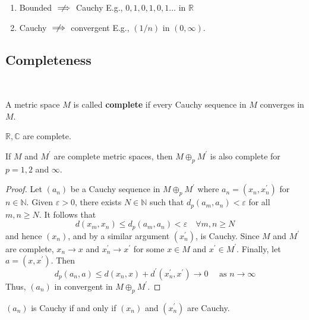 \documentclass[a4paper]{article}
\begin{document}
\begin{remark}
\begin{enumerate}
    \item Bounded $\centernot\implies$ Cauchy E.g., $0,1,0,1,0,1 \ldots$ in $\mathbb{R}$
    \item Cauchy $\centernot\implies$ convergent E.g., $(1 / n)$ in $(0, \infty)$.
\end{enumerate}
\end{remark}

\subsection{Completeness}\ \vspace{-1.5em}
\begin{definition}
	A metric space \( M \) is called \textbf{complete} if every Cauchy sequence in \( M \) converges in \( M \).
\end{definition}
\begin{example}
	\( \mathbb R, \mathbb C \) are complete.
\end{example}
\begin{proposition}
    If $M$ and $M^{\prime}$ are complete metric spaces, then $M \oplus_p M^{\prime}$ is also complete for $p=1,2$ and $\infty$.
\end{proposition}
\begin{proof}
    Let $\left(a_n\right)$ be a Cauchy sequence in $M \oplus_p M^{\prime}$ where $a_n=\left(x_n, x_n^{\prime}\right)$ for $n \in \mathbb{N}$. Given $\varepsilon>0$, there exists $N \in \mathbb{N}$ such that $d_p\left(a_m, a_n\right)<\varepsilon$ for all $m, n \geqslant N$. It follows that
    \[
    d\left(x_m, x_n\right) \leqslant d_p\left(a_m, a_n\right)<\varepsilon \quad \forall m, n \geqslant N
    \]
    and hence $\left(x_n\right)$, and by a similar argument $\left(x_n^{\prime}\right)$, is Cauchy. Since $M$ and $M^{\prime}$ are complete, $x_n \rightarrow x$ and $x_n^{\prime} \rightarrow x^{\prime}$ for some $x \in M$ and $x^{\prime} \in M^{\prime}$. Finally, let $a=\left(x, x^{\prime}\right)$. Then
    \[
    d_p\left(a_n, a\right) \leqslant d\left(x_n, x\right)+d^{\prime}\left(x_n^{\prime}, x^{\prime}\right) \rightarrow 0 \quad \text { as } n \rightarrow \infty
    \]
    Thus, $\left(a_n\right)$ in convergent in $M \oplus_p M^{\prime}$.
\end{proof}
\begin{note}
    $\left(a_n\right)$ is Cauchy if and only if $\left(x_n\right)$ and $\left(x_n^{\prime}\right)$ are Cauchy.
\end{note}
\end{document}
